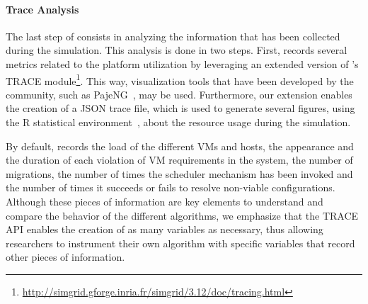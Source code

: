 \vspace*{-.2cm}
\paragraph{Trace Analysis}
\label{subsec:traces-analysis}

The last step of \vmps consists in analyzing the information that has
been collected during the simulation.
This analysis is done in two steps. First, \vmps records several
metrics related to the platform utilization %
by leveraging an extended version of \sg's TRACE
module\footnote{\url{http://simgrid.gforge.inria.fr/simgrid/3.12/doc/tracing.html}}.
This way, visualization tools that have been developed by the \sg
community, such as PajeNG~\cite{pageng:www}, may be used. Furthermore,
our extension enables the creation of a JSON trace file, which is used to generate several figures, using the R
statistical environment~\cite{R:Bloomfield:2014},
about the resource usage during the simulation.

By default, \vmps records the load of the different VMs and hosts, the
appearance and the duration of each violation of VM requirements in
the system, the number of migrations, the number of times the
scheduler mechanism has been invoked and the number of times it
succeeds or fails to resolve non-viable configurations.
%
Although these pieces of information are key elements to understand
and compare the behavior of the different algorithms, we emphasize
that the TRACE API enables the creation of as many variables as
necessary, thus allowing researchers to instrument their own algorithm
with specific variables that record other pieces of information.
